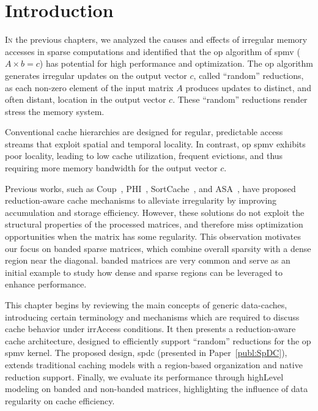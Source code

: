 
\section{Introduction}
\label{sec:spdc:intro}

\lettrine{I}{n} the previous chapters, we analyzed the causes and effects of irregular memory accesses in sparse computations and identified that the \acrfull{op} algorithm of \acrfull{spmv} ($A \times b = c$) has potential for high performance and optimization.
The \acrshort{op} algorithm generates irregular updates on the output vector $c$, called ``random'' \glspl{reduction}, as each non-zero element of the input matrix $A$ produces updates to distinct, and often distant, location in the output vector $c$.
These ``random'' \glspl{reduction} render stress the memory system.

Conventional cache hierarchies are designed for regular, predictable access streams that exploit spatial and temporal locality.
In contrast, \acrshort{op} \acrshort{spmv} exhibits poor locality, leading to low cache utilization, frequent \glspl{eviction}, and thus requiring more memory bandwidth for the output vector $c$.

Previous works, such as Coup~\cite{Zhang2015_Coup}, PHI~\cite{Mukkara2019_PHI}, SortCache~\cite{Srikanth2021_SortCache}, and ASA~\cite{Zhang2022_ASA}, have proposed \gls{reduction}-aware cache mechanisms to alleviate irregularity by improving accumulation and storage efficiency.
However, these solutions do not exploit the structural properties of the processed matrices, and therefore miss optimization opportunities when the matrix has some regularity.
This observation motivates our focus on \gls{banded} sparse matrices, which combine overall sparsity with a dense region near the diagonal.
\Gls{banded} matrices are very common and serve as an initial example to study how dense and sparse regions can be leveraged to enhance performance.

This chapter begins by reviewing the main concepts of generic data-caches, introducing certain terminology and mechanisms which are required to discuss cache behavior under \gls{irrAccess} conditions.
It then presents a \gls{reduction}-aware cache architecture, designed to efficiently support ``random'' \glspl{reduction} for the \acrshort{op} \acrshort{spmv} kernel.
The proposed design, \acrlong{spdc} (presented in Paper~\ref{publ:SpDC}), extends traditional caching models with a region-based organization and native \gls{reduction} support.
Finally, we evaluate its performance through \gls{highLevel} modeling on \gls{banded} and non-\gls{banded} matrices, highlighting the influence of data regularity on cache efficiency.